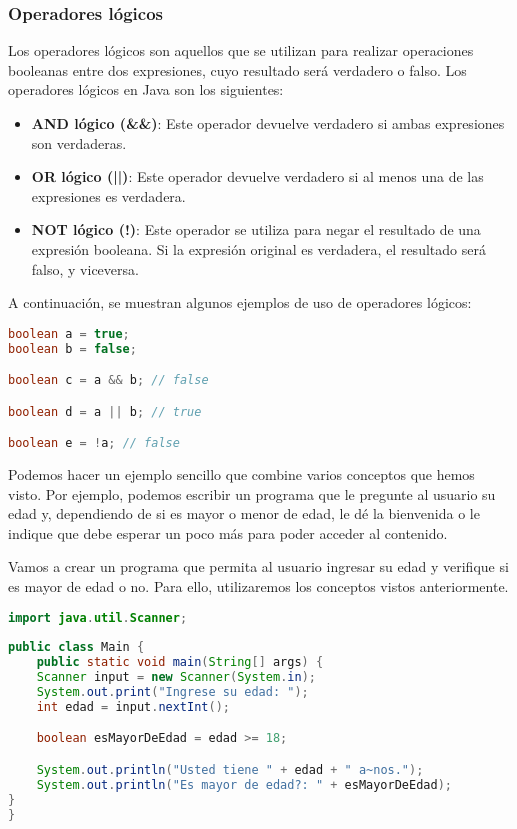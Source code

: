 \documentclass{article}
\begin{document}
\subsubsection*{Operadores lógicos}

Los operadores lógicos son aquellos que se utilizan para realizar operaciones booleanas entre dos expresiones, cuyo resultado será verdadero o falso. Los operadores lógicos en Java son los siguientes:

\begin{itemize}
\item \textbf{AND lógico (\&\&)}: Este operador devuelve verdadero si ambas expresiones son verdaderas.
\item \textbf{OR lógico (||)}: Este operador devuelve verdadero si al menos una de las expresiones es verdadera.
\item \textbf{NOT lógico (!)}: Este operador se utiliza para negar el resultado de una expresión booleana. Si la expresión original es verdadera, el resultado será falso, y viceversa.
\end{itemize}

A continuación, se muestran algunos ejemplos de uso de operadores lógicos:

\begin{lstlisting}[language=Java]
boolean a = true;
boolean b = false;

boolean c = a && b; // false

boolean d = a || b; // true

boolean e = !a; // false
\end{lstlisting}


Podemos hacer un ejemplo sencillo que combine varios conceptos que hemos visto. Por ejemplo, podemos escribir un programa que le pregunte al usuario su edad y, dependiendo de si es mayor o menor de edad, le dé la bienvenida o le indique que debe esperar un poco más para poder acceder al contenido.

Vamos a crear un programa que permita al usuario ingresar su edad y verifique si es mayor de edad o no. Para ello, utilizaremos los conceptos vistos anteriormente.

\begin{lstlisting}[language=Java]
import java.util.Scanner;
    
public class Main {
    public static void main(String[] args) {
    Scanner input = new Scanner(System.in);
    System.out.print("Ingrese su edad: ");
    int edad = input.nextInt();

    boolean esMayorDeEdad = edad >= 18;

    System.out.println("Usted tiene " + edad + " a~nos.");
    System.out.println("Es mayor de edad?: " + esMayorDeEdad);
}
}
\end{lstlisting}
\end{document}
